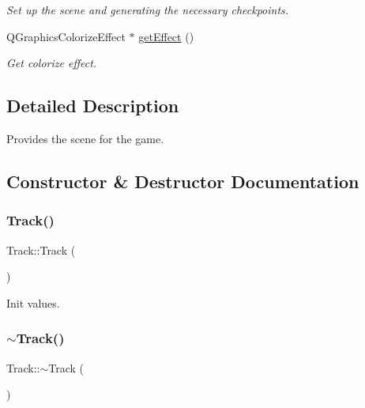 \begin{DoxyCompactItemize}
\begin{DoxyCompactList}\small\item\em Set up the scene and generating the necessary checkpoints. \end{DoxyCompactList}\item 
Q\+Graphics\+Colorize\+Effect $\ast$ \mbox{\hyperlink{class_track_a6dc1474b201e82f4fe7408276d1f0fdf}{get\+Effect}} ()
\begin{DoxyCompactList}\small\item\em Get colorize effect. \end{DoxyCompactList}\end{DoxyCompactItemize}


\subsection{Detailed Description}
Provides the scene for the game. 

\subsection{Constructor \& Destructor Documentation}
\mbox{\label{class_track_a11457bcda8be04595018c11173d8241c}} 
\subsubsection{\texorpdfstring{Track()}{Track()}}
{\footnotesize\ttfamily Track\+::\+Track (\begin{DoxyParamCaption}{ }\end{DoxyParamCaption})}



Init values. 

\mbox{\label{class_track_a416e75e66accc8eb9e3fafc3e8555216}} 
\subsubsection{\texorpdfstring{$\sim$Track()}{~Track()}}
{\footnotesize\ttfamily Track\+::$\sim$\+Track (\begin{DoxyParamCaption}{ }\end{DoxyParamCaption})}




